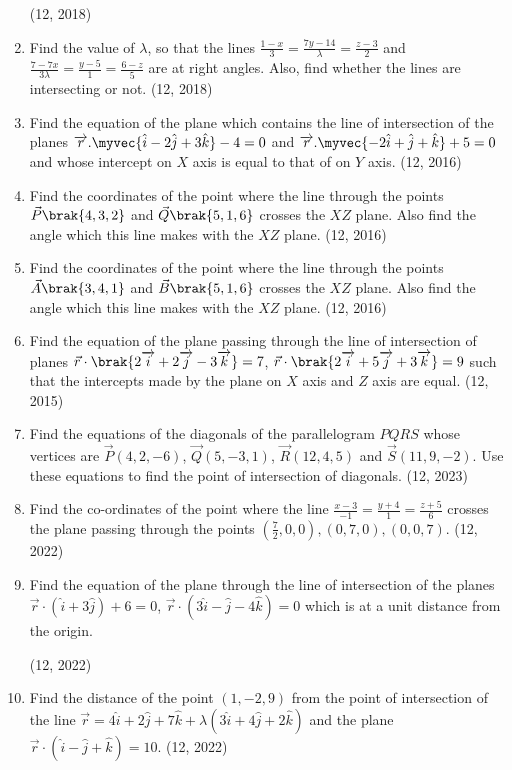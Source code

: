 \begin{enumerate}[label=\thesubsection.\arabic*, ref=\thesubsection.\theenumi]
\hfill (12, 2018) 
\item Find the value of $\lambda$, so that the lines $\frac{1-x}{3}=\frac{7y-14}{\lambda}=\frac{z-3}{2}$ and $\frac{7-7x}{3\lambda}=\frac{y-5}{1}=\frac{6-z}{5}$ are at right angles. Also, find whether the lines are intersecting or not.       
\hfill (12, 2018) 
\item Find the equation of the plane which contains the line of intersection of the planes
          $\overrightarrow{r}.\myvec{\hat{i} - 2\hat{j} + 3\hat{k}} - 4  = 0$ 
	  and
          $\overrightarrow{r}.\myvec{-2\hat{i} + \hat{j} + \hat{k}} + 5  = 0$
      and whose intercept on $X$ axis is equal to that of on $Y$ axis. \hfill (12, 2016)
\item Find the coordinates of the point where the line through the points $\vec{P}\brak{4, 3, 2}$ and $\vec{Q}\brak{5,1,6}$ crosses the $XZ$ plane. Also find the angle which this line makes with the $XZ$ plane. \hfill (12, 2016)
\item Find the coordinates of the point where the line through the points $\vec{A}\brak{3,4,1}$ and $\vec{B}\brak{5,1,6}$ crosses the $XZ$ plane. Also find the angle which this line makes with the $XZ$ plane. \hfill (12, 2016)
\item Find the equation of the plane passing through the line of intersection of planes 
$\vec{r}\cdot\brak{2\overrightarrow{i}+2\overrightarrow{j}-3\overrightarrow{k}}=7$, $\vec{r}\cdot\brak{2\overrightarrow{i}+5\overrightarrow{j}+3\overrightarrow{k}}=9$
such that the intercepts made by the plane on $X$ axis and $Z$ axis are equal. \hfill (12, 2015)
\item Find the equations of the diagonals of the parallelogram $PQRS$ whose vertices are $\vec{P}(4,2,-6)$, $\vec{Q}(5,-3,1)$, $\vec{R}(12,4,5)$ and $\vec{S}(11,9,-2)$. Use these equations to find the point of intersection of diagonals. \hfill (12, 2023)
\item Find the co-ordinates of the point where the line $\frac{x-3}{-1}=\frac{y+4}{1}=\frac{z+5}{6}$ crosses the plane passing through the points $\left(\frac{7}{2},0,0\right),(0,7,0),(0,0,7)$. \hfill (12, 2022)

\item Find the equation of the plane through the line of intersection of the planes
		$\vec{r}\cdot(\hat{i}+3\hat{j})+6=0$,
		$\vec{r}\cdot(3\hat{i}-\hat{j}-4\hat{k})=0$
	which is at a unit distance from the origin.

	\hfill (12, 2022)
\item Find the distance of the point $(1,-2, 9)$ from the point of intersection of the line
		$\vec{r}=4\hat{i}+2\hat{j}+7\hat{k}+\lambda(3\hat{i}+4\hat{j}+2\hat{k})$
	and the plane
		$\vec{r}\cdot(\hat{i}-\hat{j}+\hat{k})=10$.
\hfill (12, 2022)


\end{enumerate}
